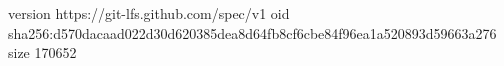 version https://git-lfs.github.com/spec/v1
oid sha256:d570dacaad022d30d620385dea8d64fb8cf6cbe84f96ea1a520893d59663a276
size 170652
